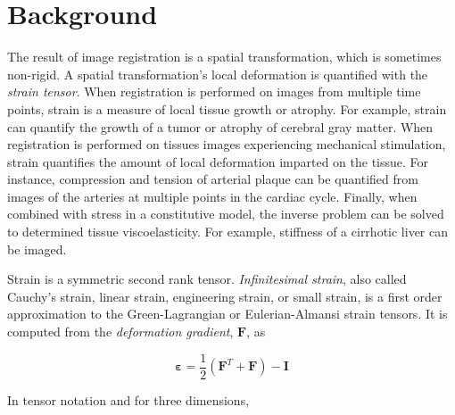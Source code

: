 \documentclass{InsightArticle}
\newcommand{\IJhandlerIDnumber}{3573}
\begin{document}
\IJhandlenote{\IJhandlerIDnumber}

\tableofcontents

\section{Background}

The result of image registration is a spatial transformation, which is sometimes
non-rigid. A spatial transformation's local deformation is quantified with
the \textit{strain tensor}. When registration is performed on images from multiple
time points, strain is a measure of local tissue growth or atrophy. For
example, strain can quantify the growth of a tumor or atrophy of cerebral gray
matter. When registration is performed on tissues images experiencing
mechanical stimulation, strain quantifies the amount of local
deformation imparted on the tissue. For instance, compression and tension of
arterial plaque can be quantified from images of the arteries at multiple
points in the cardiac cycle. Finally, when combined with stress in a
constitutive model, the inverse problem can be solved to determined tissue
viscoelasticity. For example, stiffness of a cirrhotic liver can be imaged.

Strain is a symmetric second rank tensor. \textit{Infinitesimal strain}, also
called Cauchy's strain, linear strain, engineering strain, or small strain, is a
first order approximation to the Green-Lagrangian or Eulerian-Almansi strain
tensors. It is computed from the \textit{deformation gradient},
$\mathbf{F}$, as\cite{WikipediaStrainTheory}

\begin{equation}
  \mathbf{\varepsilon}=\frac{1}{2}\left(\mathbf{F}^T+\mathbf{F}\right)-\mathbf{I}
\end{equation}

In tensor notation and for three dimensions,
\end{document}
